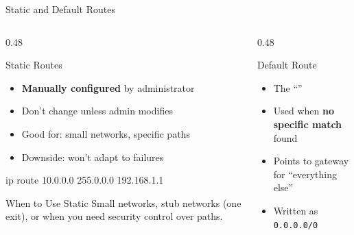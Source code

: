 \documentclass[aspectratio=169]{beamer}  %
\begin{document}
\begin{frame}{Static and Default Routes}
    \begin{columns}[T]
        \begin{column}{0.48\textwidth}
            \begin{block}{Static Routes}
                \small
                \begin{itemize}\setlength{\itemsep}{2pt}
                    \item \textbf{Manually configured} by administrator
                    \item Don't change unless admin modifies
                    \item Good for: small networks, specific paths
                    \item Downside: won't adapt to failures
                \end{itemize}
                
                \vspace{0.2em}
                \ttfamily\footnotesize
                ip route 10.0.0.0 255.0.0.0 192.168.1.1
            \end{block}
            
            \vspace{0.2em}
            \begin{alertblock}{When to Use Static}
                \small
                Small networks, stub networks (one exit), or when you need security control over paths.
            \end{alertblock}
        \end{column}
        \begin{column}{0.48\textwidth}
            \begin{block}{Default Route}
                \small
                \begin{itemize}\setlength{\itemsep}{2pt}
                    \item The ``''
                    \item Used when \textbf{no specific match} found
                    \item Points to gateway for ``everything else''
                    \item Written as \texttt{0.0.0.0/0}
                \end{itemize}
                

\end{block}
\end{column}
\end{columns}
\end{frame}
\end{document}
